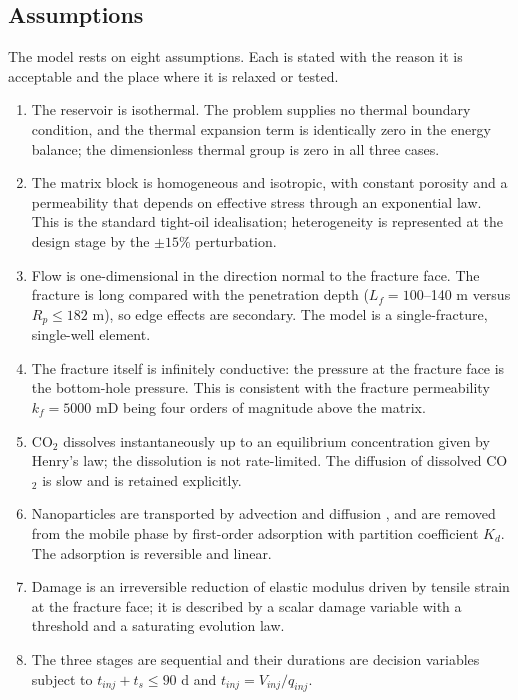 \documentclass{swmcmthesis}
\begin{document}
\subsection{Assumptions}
The model rests on eight assumptions. Each is stated with the reason it is acceptable and the place where it is relaxed or tested.
\begin{enumerate}[leftmargin=2em,itemsep=2pt]
\item[A1] The reservoir is isothermal. The problem supplies no thermal boundary condition, and the thermal expansion term is identically zero in the energy balance; the dimensionless thermal group is zero in all three cases.
\item[A2] The matrix block is homogeneous and isotropic, with constant porosity and a permeability that depends on effective stress through an exponential law. This is the standard tight-oil idealisation; heterogeneity is represented at the design stage by the $\pm15\%$ perturbation.
\item[A3] Flow is one-dimensional in the direction normal to the fracture face. The fracture is long compared with the penetration depth ($L_f=100$--140 m versus $R_p\le182$ m), so edge effects are secondary. The model is a single-fracture, single-well element.
\item[A4] The fracture itself is infinitely conductive: the pressure at the fracture face is the bottom-hole pressure. This is consistent with the fracture permeability $k_f=5000$ mD being four orders of magnitude above the matrix.
\item[A5] CO$_2$ dissolves instantaneously up to an equilibrium concentration given by Henry's law; the dissolution is not rate-limited. The diffusion \cite{crank} of dissolved CO$_2$ is slow and is retained explicitly.
\item[A6] Nanoparticles are transported by advection and diffusion \cite{crank}, and are removed from the mobile phase by first-order adsorption with partition coefficient $K_d$. The adsorption is reversible and linear.
\item[A7] Damage is an irreversible reduction of elastic modulus driven by tensile strain at the fracture face; it is described by a scalar damage variable with a threshold and a saturating evolution law.
\item[A8] The three stages are sequential and their durations are decision variables subject to $t_{inj}+t_s\le90$ d and $t_{inj}=V_{inj}/q_{inj}$.
\end{enumerate}
\end{document}
